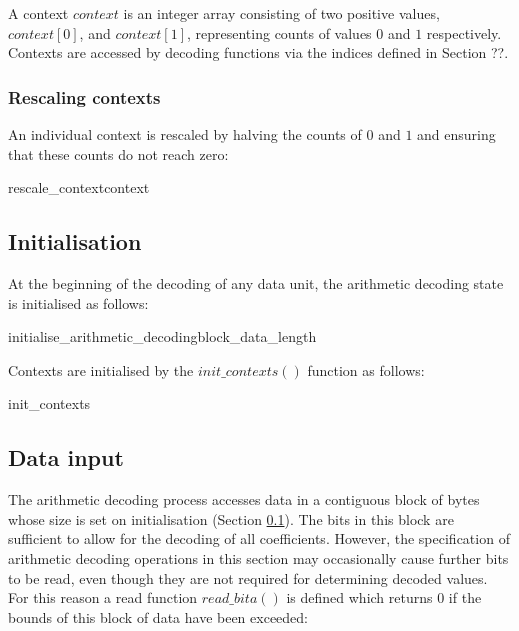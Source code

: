 A context $context$ is an integer array consisting of two positive values,
$context[0]$, and $context[1]$, representing counts of values $0$ and $1$
respectively. Contexts are accessed by decoding functions
via the indices defined in Section ??.

\subsubsection{Rescaling contexts}
\label{rescalecontext}

An individual context is rescaled by halving the counts of $0$ and $1$ and ensuring that
these counts do not reach zero:

\begin{pseudo}{rescale\_context}{context}
\end{pseudo}

\subsection{Initialisation}
\label{initarith}

At the beginning of the decoding of any data unit, the arithmetic
decoding state is initialised as follows:

\begin{pseudo}{initialise\_arithmetic\_decoding}{block\_data\_length}
\end{pseudo}

Contexts are initialised by the $init\_contexts()$ function as follows:

\begin{pseudo}{init\_contexts}{}
\bsEND
\end{pseudo}

\subsection{Data input}
\label{inputarith}

The arithmetic decoding process accesses data in a contiguous block of bytes
whose size is set on initialisation (Section \ref{initarith}). The bits in this
block are sufficient to allow for the
decoding of all coefficients. However, the specification of arithmetic
decoding operations in this section may occasionally cause further bits to be read,
even though they are not required for determining decoded values. For this
reason a read function $read\_bita()$ is defined which returns $0$ if the
bounds of this block of data have been exceeded:

